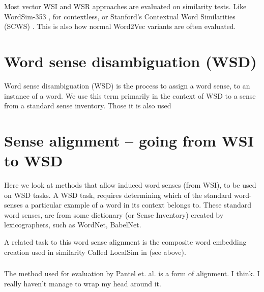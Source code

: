 \documentclass[12pt,parskip]{komatufte}
\begin{document}
Most vector WSI and WSR approaches are evaluated on similarity tests.
Like WordSim-353 \cite{WordSim353}, for contextless, or Stanford's Contextual Word Similarities (SCWS) \cite{Huang2012}. This is also how normal Word2Vec variants are often evaluated.









\section{Word sense disambiguation (WSD)}
Word sense disambiguation (WSD) is the process to assign a word sense, to an instance of a word. We use this term primarily in the context of WSD to a sense from a standard sense inventory. Those it is also used 



\section{Sense alignment -- going from WSI to WSD}
Here we look at methods that allow induced word senses (from WSI), to be used on WSD tasks.
A WSD task, requires determining which of the standard word-senses a particular example of a word in its context belongs to.
These standard word senses, are from some dictionary (or Sense Inventory) created by 
lexicographers, such as WordNet, BabelNet.

A related task to this word sense alignment is the composite word embedding creation used in similarity Called LocalSim in \textcite{Huang2012} (see above).



\subsubsection{\textcite {pantel2002WSI}}
The method used for evaluation by Pantel et. al. is a form of alignment. I think.
I really haven't manage to wrap my head around it.
\end{document}
